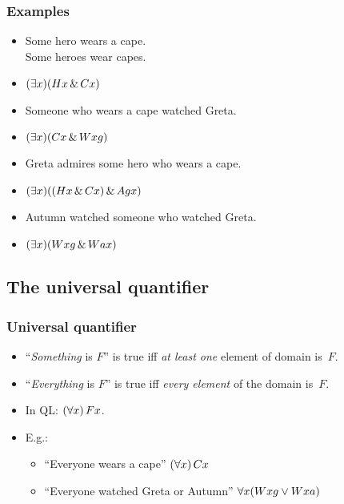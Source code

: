 \begin{frame}
\frametitle{Examples}

\begin{itemize}[<+->]
  \item \alert{Some hero} wears a cape.\\
  \alert{Some heroes} wear capes.\\
  \item[] \alert{$(\exists x)(Hx \,\&\, Cx)$}
  \item \alert{Someone who wears a cape} watched Greta.\\
  \item[] \alert{$(\exists x)(Cx \,\&\, Wxg)$}
  \item Greta admires \alert{some hero who wears a cape}.
  \item[] \alert{$(\exists x)((Hx \,\&\, Cx) \,\&\, Agx)$}
  \item Autumn watched \alert{someone who watched Greta}.
  \item[] \alert{$(\exists x)(Wxg \,\&\, Wax)$}
\end{itemize}
\end{frame}

\subsection{The universal quantifier}

\begin{frame}
\frametitle{Universal quantifier}

\begin{itemize}[<+->]
  \item ``\emph{Something} is $F$'' is true iff \emph{at least one} element of domain
  is~$F$.
  \item ``\emph{Everything} is $F$'' is true iff \emph{every element} of the domain
  is~$F$.
  \item In QL: $(\forall x)\, Fx$.
  \item E.g.:
    \begin{itemize}
      \item ``Everyone wears a cape'' \alert{$(\forall x)\,Cx$}
      \item ``Everyone watched Greta or Autumn'' \alert{$\forall
      x(Wxg \vee Wxa)$}
    \end{itemize}
\end{itemize}
\end{frame}

